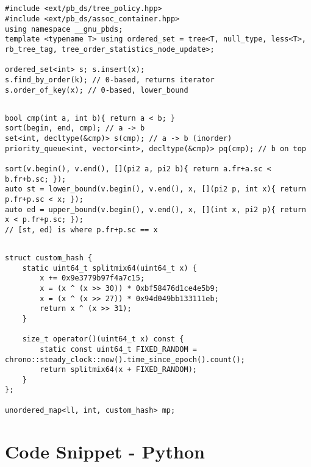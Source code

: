 \documentclass[landscape, 8pt, a4paper, oneside, twocolumn]{extarticle}
\begin{document}
\subsection{}
\begin{verbatim}
#include <ext/pb_ds/tree_policy.hpp>
#include <ext/pb_ds/assoc_container.hpp>
using namespace __gnu_pbds;
template <typename T> using ordered_set = tree<T, null_type, less<T>, rb_tree_tag, tree_order_statistics_node_update>;

ordered_set<int> s; s.insert(x);
s.find_by_order(k); // 0-based, returns iterator
s.order_of_key(x); // 0-based, lower_bound
\end{verbatim}
\subsection{}
\begin{verbatim}
bool cmp(int a, int b){ return a < b; }
sort(begin, end, cmp); // a -> b
set<int, decltype(&cmp)> s(cmp); // a -> b (inorder)
priority_queue<int, vector<int>, decltype(&cmp)> pq(cmp); // b on top

sort(v.begin(), v.end(), [](pi2 a, pi2 b){ return a.fr+a.sc < b.fr+b.sc; });
auto st = lower_bound(v.begin(), v.end(), x, [](pi2 p, int x){ return p.fr+p.sc < x; });
auto ed = upper_bound(v.begin(), v.end(), x, [](int x, pi2 p){ return x < p.fr+p.sc; });
// [st, ed) is where p.fr+p.sc == x
\end{verbatim}
\subsection{}
\begin{verbatim}
struct custom_hash {
    static uint64_t splitmix64(uint64_t x) {
        x += 0x9e3779b97f4a7c15;
        x = (x ^ (x >> 30)) * 0xbf58476d1ce4e5b9;
        x = (x ^ (x >> 27)) * 0x94d049bb133111eb;
        return x ^ (x >> 31);
    }

    size_t operator()(uint64_t x) const {
        static const uint64_t FIXED_RANDOM = chrono::steady_clock::now().time_since_epoch().count();
        return splitmix64(x + FIXED_RANDOM);
    }
};

unordered_map<ll, int, custom_hash> mp;
\end{verbatim}
\section{Code Snippet - Python}
\end{document}
